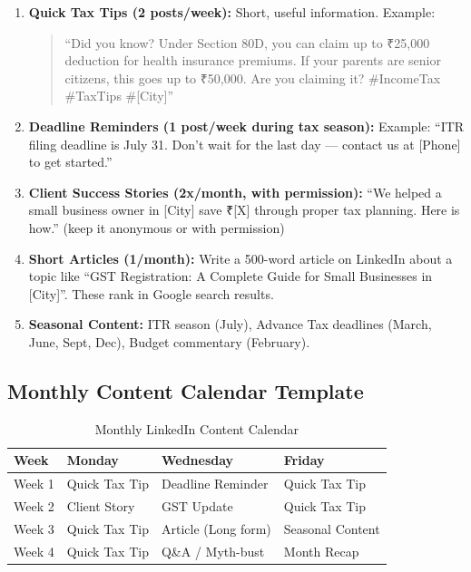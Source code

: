\documentclass[12pt, a4paper]{book}
\begin{document}
\begin{enumerate}[leftmargin=1.5em]
  \item \textbf{Quick Tax Tips (2 posts/week):}
    Short, useful information. Example:
    \begin{quote}
    ``Did you know? Under Section 80D, you can claim up to ₹25,000 deduction
    for health insurance premiums. If your parents are senior citizens, this goes
    up to ₹50,000. Are you claiming it? \#IncomeTax \#TaxTips \#[City]''
    \end{quote}

  \item \textbf{Deadline Reminders (1 post/week during tax season):}
    Example: ``ITR filing deadline is July 31. Don't wait for the last day ---
    contact us at [Phone] to get started.''

  \item \textbf{Client Success Stories (2x/month, with permission):}
    ``We helped a small business owner in [City] save ₹[X] through proper
    tax planning. Here is how.'' (keep it anonymous or with permission)

  \item \textbf{Short Articles (1/month):}
    Write a 500-word article on LinkedIn about a topic like
    ``GST Registration: A Complete Guide for Small Businesses in [City]''.
    These rank in Google search results.

  \item \textbf{Seasonal Content:}
    ITR season (July), Advance Tax deadlines (March, June, Sept, Dec),
    Budget commentary (February).
\end{enumerate}

\subsection{Monthly Content Calendar Template}

\begin{table}[h!]
\centering
\begin{tabular}{|p{2cm}|p{3.5cm}|p{3.5cm}|p{3.5cm}|}
\hline
\textbf{Week} & \textbf{Monday} & \textbf{Wednesday} & \textbf{Friday} \\
\hline
Week 1 & Quick Tax Tip & Deadline Reminder & Quick Tax Tip \\
\hline
Week 2 & Client Story & GST Update & Quick Tax Tip \\
\hline
Week 3 & Quick Tax Tip & Article (Long form) & Seasonal Content \\
\hline
Week 4 & Quick Tax Tip & Q\&A / Myth-bust & Month Recap \\
\hline
\end{tabular}
\caption{Monthly LinkedIn Content Calendar}
\end{table}
\end{document}
